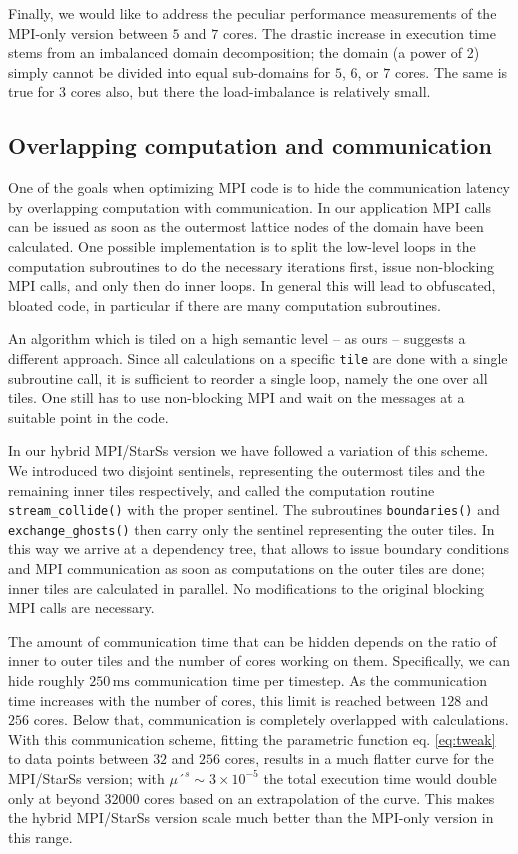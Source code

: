 \documentclass[conference]{IEEEtran}
\newcommand{\starss}{{StarSs}}
\begin{document}
Finally, we would like to address the peculiar performance measurements
of the MPI-only version between $5$ and $7$ cores. The drastic
increase in execution time stems from an imbalanced domain
decomposition; the domain (a power of 2) simply cannot be divided into
equal sub-domains for $5$, $6$, or $7$ cores. The same is true for $3$
cores also, but there the load-imbalance is relatively small.

\subsection{Overlapping computation and communication}
\label{sec:discuss_overlap}

One of the goals when optimizing MPI code is to hide the communication
latency by overlapping computation with communication. In our
application MPI calls can be issued as soon as the outermost lattice
nodes of the domain have been calculated. One possible implementation
is to split the low-level loops in the computation subroutines
to do the necessary iterations first, issue non-blocking MPI calls,
and only then do inner loops. In general this will lead to obfuscated,
bloated code, in particular if there are many computation subroutines.

An algorithm which is tiled on a high semantic level -- as ours -- suggests
a different approach. Since all calculations on a specific \verb!tile!
are done with a single subroutine call, it is sufficient to reorder a
single loop, namely the one over all tiles. One still has to use
non-blocking MPI and wait on the messages at a suitable point in the
code.   

In our hybrid MPI/\starss{} version we have followed a variation of
this scheme. We introduced two disjoint sentinels, representing
the outermost tiles and the remaining inner tiles respectively, 
and called the computation routine \verb!stream_collide()! with the
proper sentinel. The subroutines \verb!boundaries()! and
\verb!exchange_ghosts()! then carry only the sentinel representing the
outer tiles. In this way we arrive at a dependency tree, that allows to
issue boundary conditions and MPI communication as soon as
computations on the outer tiles are done; inner tiles are calculated in
parallel. No modifications to the original blocking MPI calls are
necessary. 

The amount of communication time that can be hidden depends
on the ratio of inner to outer tiles and the number of cores
working on them. Specifically, we can hide roughly $250\, \mathrm{ms}$
communication time per timestep. As the communication time increases
with the number of cores, this limit is reached between $128$ and
$256$ cores. Below that, communication is completely overlapped with
calculations. With this communication scheme, fitting the parametric function
eq. \ref{eq:tweak} to data points between $32$ and $256$ cores,
results in a much flatter curve for the MPI/\starss{} version; with
$\mu´^s \sim 3 \times 10^{-5}$ the total execution time would double
only at beyond $32000$ cores based on an extrapolation of the curve. This makes
the hybrid MPI/\starss{} version scale much better than the MPI-only
version in this range. 
\end{document}
